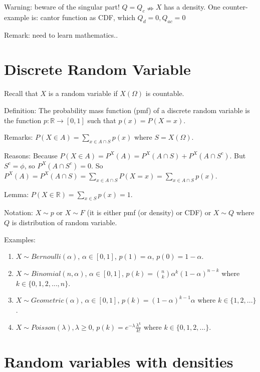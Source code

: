 \documentclass[12pt]{article}
\begin{document}
Warning: beware of the singular part! $Q=Q_c \nRightarrow X$ has a density.
One counter-example is: cantor function as CDF, which $Q_d=0,Q_{ac}=0$
\bigbreak

Remark: need to learn mathematics..

\section{Discrete Random Variable}

Recall that $X$ is a random variable if $X(\Omega)$ is countable.
\bigbreak

Definition: The probability mass function (pmf) of a discrete random variable
is the function $p:\mathbb{R}\rightarrow [0,1]$ such that $p(x)=P(X=x)$.

Remarks:
$P(X\in A)=\sum\limits_{x\in A\cap S} p(x)$ where $S=X(\Omega)$. 

Reasons: Because $P(X\in A)=P^{X}(A)=P^{X}(A\cap S)+P^{X}(A\cap S^c)$.
        But $S^c=\phi$, so $P^{X}(A\cap S^c)=0$. So $P^{X}(A)=P^{X}(A\cap S)=\sum\limits_{x\in A\cap S}P(X=x)=
        \sum\limits_{x\in A\cap S} p(x)$.
        
Lemma: $P(X\in \mathbb{R})=\sum\limits_{x\in S} p(x)=1$.
\bigbreak

Notation: $X\sim p$ or $X\sim F$ (it is either pmf (or density) or CDF) or $X\sim Q$ where $Q$ is distribution of random variable.
\bigbreak

Examples:
\begin{enumerate}
    \item $X\sim Bernoulli(\alpha)$, $\alpha \in[0,1]$, $p(1)=\alpha$, $p(0)=1-\alpha$.
        
    \item $X\sim Binomial(n,\alpha)$, $\alpha \in [0,1]$, $p(k)=\binom{n}{k}\alpha^k (1-\alpha)^{n-k}$ where
        $k\in\{0,1,2,...,n\}$.
        
    \item $X\sim Geometric(\alpha)$, $\alpha\in [0,1]$, $p(k)=(1-\alpha)^{k-1}\alpha$ where $k\in\{1,2,...\}$.

    \item $X\sim Poisson(\lambda),\lambda\ge 0$, $p(k)=e^{-\lambda}\frac{\lambda^{k}}{k!}$ where $k\in\{0,1,2,...\}$.
\end{enumerate}

\section{Random variables with densities}
\end{document}
